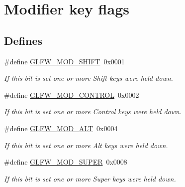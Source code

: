 \hypertarget{group__mods}{\section{\-Modifier key flags}
\label{group__mods}
}
\subsection*{\-Defines}
\begin{DoxyCompactItemize}
\item 
\hypertarget{group__mods_ga14994d3196c290aaa347248e51740274}{\#define \hyperlink{group__mods_ga14994d3196c290aaa347248e51740274}{\-G\-L\-F\-W\-\_\-\-M\-O\-D\-\_\-\-S\-H\-I\-F\-T}~0x0001}\label{group__mods_ga14994d3196c290aaa347248e51740274}

\begin{DoxyCompactList}\small\item\em \-If this bit is set one or more \-Shift keys were held down. \end{DoxyCompactList}\item 
\hypertarget{group__mods_ga6ed94871c3208eefd85713fa929d45aa}{\#define \hyperlink{group__mods_ga6ed94871c3208eefd85713fa929d45aa}{\-G\-L\-F\-W\-\_\-\-M\-O\-D\-\_\-\-C\-O\-N\-T\-R\-O\-L}~0x0002}\label{group__mods_ga6ed94871c3208eefd85713fa929d45aa}

\begin{DoxyCompactList}\small\item\em \-If this bit is set one or more \-Control keys were held down. \end{DoxyCompactList}\item 
\hypertarget{group__mods_gad2acd5633463c29e07008687ea73c0f4}{\#define \hyperlink{group__mods_gad2acd5633463c29e07008687ea73c0f4}{\-G\-L\-F\-W\-\_\-\-M\-O\-D\-\_\-\-A\-L\-T}~0x0004}\label{group__mods_gad2acd5633463c29e07008687ea73c0f4}

\begin{DoxyCompactList}\small\item\em \-If this bit is set one or more \-Alt keys were held down. \end{DoxyCompactList}\item 
\hypertarget{group__mods_ga6b64ba10ea0227cf6f42efd0a220aba1}{\#define \hyperlink{group__mods_ga6b64ba10ea0227cf6f42efd0a220aba1}{\-G\-L\-F\-W\-\_\-\-M\-O\-D\-\_\-\-S\-U\-P\-E\-R}~0x0008}\label{group__mods_ga6b64ba10ea0227cf6f42efd0a220aba1}

\begin{DoxyCompactList}\small\item\em \-If this bit is set one or more \-Super keys were held down. \end{DoxyCompactList}\end{DoxyCompactItemize}
